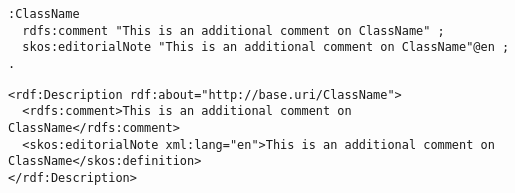 \vspace{-\parskip}
\begin{minipage}[b]{.45\textwidth}
\begin{lstlisting}[language=Turtle, caption={Comment in Turtle syntax}, captionpos=b]
:ClassName 
  rdfs:comment "This is an additional comment on ClassName" ;
  skos:editorialNote "This is an additional comment on ClassName"@en ;
.
\end{lstlisting}
\end{minipage}%
\quad\vspace{-\parskip}
\begin{minipage}[b]{.5\textwidth}
\begin{lstlisting}[language=RDF/XML, caption={Comment in RDF/XML syntax}, captionpos=b]
<rdf:Description rdf:about="http://base.uri/ClassName">
  <rdfs:comment>This is an additional comment on ClassName</rdfs:comment>
  <skos:editorialNote xml:lang="en">This is an additional comment on ClassName</skos:definition>
</rdf:Description>
\end{lstlisting}
\end{minipage}
\vspace{-\parskip}